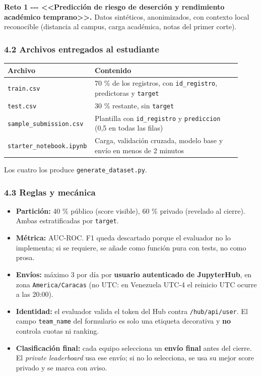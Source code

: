 \documentclass[11pt,a4paper]{article}
\providecommand{\tightlist}{%
  \setlength{\itemsep}{0pt}\setlength{\parskip}{0pt}}
\begin{document}
\textbf{Reto 1 -\/-\/- \textless\textless Predicción de riesgo de deserción y rendimiento académico temprano\textgreater\textgreater.} Datos sintéticos, anonimizados, con contexto local reconocible (distancia al campus, carga académica, notas del primer corte).

\hypertarget{42-archivos-entregados-al-estudiante}{%
\subsubsection{4.2 Archivos entregados al estudiante}\label{42-archivos-entregados-al-estudiante}}

\begin{longtable}[]{@{}p{0.300\linewidth}p{0.620\linewidth}@{}}
\toprule
Archivo & Contenido \\
\midrule
\endhead
\texttt{train.\allowbreak{}csv} & 70 \% de los registros, con \texttt{id\_\allowbreak{}registro}, predictoras y \texttt{target} \\
\texttt{test.\allowbreak{}csv} & 30 \% restante, sin \texttt{target} \\
\texttt{sample\_\allowbreak{}submission.\allowbreak{}csv} & Plantilla con \texttt{id\_\allowbreak{}registro} y \texttt{prediccion} (0,5 en todas las filas) \\
\texttt{starter\_\allowbreak{}notebook.\allowbreak{}ipynb} & Carga, validación cruzada, modelo base y envío en menos de 2 minutos \\
\bottomrule
\end{longtable}

Los cuatro los produce \texttt{generate\_\allowbreak{}dataset.\allowbreak{}py}.

\hypertarget{43-reglas-y-mecuxe1nica}{%
\subsubsection{4.3 Reglas y mecánica}\label{43-reglas-y-mecuxe1nica}}

\begin{itemize}
\tightlist
\item
  \textbf{Partición:} 40 \% público (score visible), 60 \% privado (revelado al cierre). Ambas estratificadas por \texttt{target}.
\item
  \textbf{Métrica:} AUC-ROC. F1 queda descartado porque el evaluador no lo implementa; si se requiere, se añade como función pura con tests, no como prosa.
\item
  \textbf{Envíos:} máximo 3 por día por \textbf{usuario autenticado de JupyterHub}, en zona \texttt{America/\allowbreak{}Caracas} (no UTC: en Venezuela UTC-4 el reinicio UTC ocurre a las 20:00).
\item
  \textbf{Identidad:} el evaluador valida el token del Hub contra \texttt{/\allowbreak{}hub/\allowbreak{}api/\allowbreak{}user}. El campo \texttt{team\_\allowbreak{}name} del formulario es solo una etiqueta decorativa y \textbf{no} controla cuotas ni ranking.
\item
  \textbf{Clasificación final:} cada equipo selecciona un \textbf{envío final} antes del cierre. El \emph{private leaderboard} usa ese envío; si no lo selecciona, se usa su mejor score privado y se marca con aviso.
\end{itemize}
\end{document}
